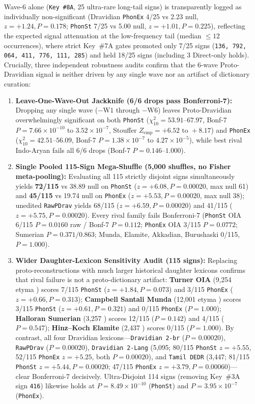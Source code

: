 \documentclass[11pt,a4paper]{article}
\begin{document}
Wave-6 alone (\texttt{Key \#8A}, 25 ultra-rare long-tail signs) is transparently logged as individually non-significant (Dravidian \texttt{PhonEx} 4/25 vs 2.23 null, $z=+1.24, P=0.178$; \texttt{PhonSt} 7/25 vs 5.00 null, $z=+1.01, P=0.225$), reflecting the expected signal attenuation at the low-frequency tail (median $\le 12$ occurrences), where strict Key~\#7A gates promoted only 7/25 signs (\texttt{136, 792, 064, 411, 776, 111, 285}) and held 18/25 signs (including 3 Direct-only holds). Crucially, three independent robustness audits confirm that the 6-wave Proto-Dravidian signal is neither driven by any single wave nor an artifact of dictionary curation:
\begin{enumerate}
  \item \textbf{Leave-One-Wave-Out Jackknife (6/6 drops pass Bonferroni-7):} Dropping any single wave ($-\text{W1}$ through $-\text{W6}$) leaves Proto-Dravidian overwhelmingly significant on both \texttt{PhonSt} ($\chi^2_{10} = 53.91\text{--}67.97$, Bonf-7 $P = 7.66 \times 10^{-10}$ to $3.52 \times 10^{-7}$, Stouffer $Z_{\text{emp}} = +6.52\text{ to }+8.17$) and \texttt{PhonEx} ($\chi^2_{10} = 42.51\text{--}56.09$, Bonf-7 $P = 1.38 \times 10^{-7}$ to $4.27 \times 10^{-5}$), while best rival Indo-Aryan fails all 6/6 drops (Bonf-7 $P = 0.146\text{--}1.000$).
  \item \textbf{Single Pooled 115-Sign Mega-Shuffle (5,000 shuffles, no Fisher meta-pooling):} Evaluating all 115 strictly disjoint signs simultaneously yields \textbf{72/115} vs 38.89 null on \texttt{PhonSt} ($z = +6.08, P = 0.00020$, max null 61) and \textbf{45/115} vs 19.74 null on \texttt{PhonEx} ($z = +5.53, P = 0.00020$, max null 38); unedited \texttt{RawPDrav} yields 68/115 ($z=+6.59, P=0.00020$) and 41/115 ($z=+5.75, P=0.00020$). Every rival family fails Bonferroni-7 (\texttt{PhonSt} OIA 6/115 $P = 0.0160$ raw / Bonf-7 $P = 0.112$; \texttt{PhonEx} OIA 3/115 $P = 0.0772$; Sumerian $P = 0.371/0.863$; Munda, Elamite, Akkadian, Burushaski 0/115, $P = 1.000$).
  \item \textbf{Wider Daughter-Lexicon Sensitivity Audit (115 signs):} Replacing proto-reconstructions with much larger historical daughter lexicons confirms that rival failure is not a proto-dictionary artifact: \textbf{Turner OIA} (9,254 etyma \citep{turner1966cdial}) scores 7/115 \texttt{PhonSt} ($z=+1.84, P=0.073$) and 3/115 \texttt{PhonEx} ($z=+0.66, P=0.313$); \textbf{Campbell Santali Munda} (12,001 etyma \citep{campbell1899santali}) scores 3/115 \texttt{PhonSt} ($z=+0.61, P=0.321$) and 0/115 \texttt{PhonEx} ($P=1.000$); \textbf{Halloran Sumerian} (3,257 \citep{halloran2006}) scores 12/115 ($P=0.142$) and 4/115 ($P=0.547$); \textbf{Hinz--Koch Elamite} (2,437 \citep{hinz1987elam}) scores 0/115 ($P=1.000$). By contrast, all four Dravidian lexicons—\texttt{Dravidian 2-br} ($P=0.00020$), \texttt{RawPDrav} ($P=0.00020$), \texttt{Dravidian 2-Lang} (5,095; 80/115 \texttt{PhonSt} $z=+5.55$, 52/115 \texttt{PhonEx} $z=+5.25$, both $P=0.00020$), and \texttt{Tamil DEDR} (3,447; 81/115 \texttt{PhonSt} $z=+5.44, P=0.00020$; 47/115 \texttt{PhonEx} $z=+3.79, P=0.00060$)—clear Bonferroni-7 decisively. Ultra-Disjoint 114 signs (removing Key~\#3A sign \texttt{416}) likewise holds at $P = 8.49 \times 10^{-10}$ (\texttt{PhonSt}) and $P = 3.95 \times 10^{-7}$ (\texttt{PhonEx}).

\end{enumerate}
\end{document}
